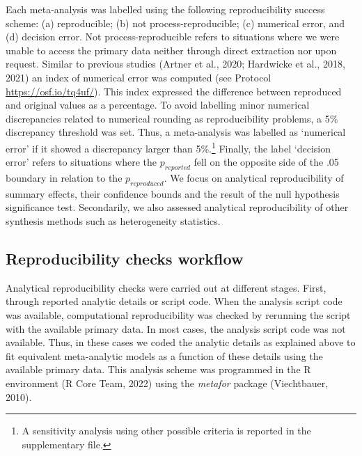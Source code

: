\documentclass[
  ,jou, a4paper,floatsintext]{apa6}
\begin{document}
Each meta-analysis was labelled using the following reproducibility success scheme: (a) reproducible; (b) not process-reproducible; (c) numerical error, and (d) decision error. Not process-reproducible refers to situations where we were unable to access the primary data neither through direct extraction nor upon request. Similar to previous studies (Artner et al., 2020; Hardwicke et al., 2018, 2021) an index of numerical error was computed (see Protocol \url{https://osf.io/tq4uf/}). This index expressed the difference between reproduced and original values as a percentage. To avoid labelling minor numerical discrepancies related to numerical rounding as reproducibility problems, a 5\% discrepancy threshold was set. Thus, a meta-analysis was labelled as `numerical error' if it showed a discrepancy larger than 5\%.\footnote{A sensitivity analysis using other possible criteria is reported in the supplementary file.}
Finally, the label `decision error' refers to situations where the \(p_{reported}\) fell on the opposite side of the .05 boundary in relation to the \(p_{reproduced}\).
We focus on analytical reproducibility of summary effects, their confidence bounds and the result of the null hypothesis significance test. Secondarily, we also assessed analytical reproducibility of other synthesis methods such as heterogeneity statistics.

\hypertarget{reproducibility-checks-workflow}{%
\subsection{Reproducibility checks workflow}\label{reproducibility-checks-workflow}}

Analytical reproducibility checks were carried out at different stages. First, through reported analytic details or script code. When the analysis script code was available, computational reproducibility was checked by rerunning the script with the available primary data. In most cases, the analysis script code was not available. Thus, in these cases we coded the analytic details as explained above to fit equivalent meta-analytic models as a function of these details using the available primary data. This analysis scheme was programmed in the R environment (R Core Team, 2022) using the \emph{metafor} package (Viechtbauer, 2010).
\end{document}
